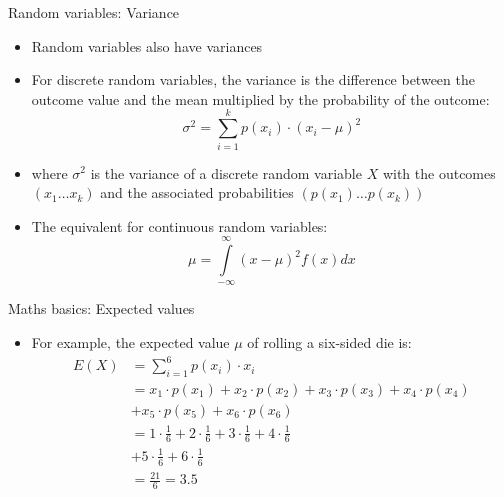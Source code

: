 \begin{frame}{Random variables: Variance}

\begin{itemize}
\itemsep1pt\parskip0pt
\item
  Random variables also have variances
\item
  For discrete random variables, the variance is the difference between
  the outcome value and the mean multiplied by the probability of the
  outcome: \[ \sigma^2 = \sum\limits_{i=1}^k p(x_i)\cdot (x_i - \mu)^2\]
\item
  where \(\sigma^2\) is the variance of a discrete random variable \(X\)
  with the outcomes \((x_1 \dots x_k)\) and the associated probabilities
  \((p(x_1)\dots p(x_k))\)
\item
  The equivalent for continuous random variables:
  \[\mu = \int\limits_{-\infty}^{\infty}(x-\mu)^2 f(x) dx\]
\end{itemize}

\end{frame}

\begin{frame}{Maths basics: Expected values}

\begin{itemize}
\itemsep1pt\parskip0pt
\item
  For example, the expected value \(\mu\) of rolling a six-sided die is:
  \[
  \begin{aligned}
  E(X) &= \sum\limits_{i=1}^{6} p(x_i) \cdot x_i \\
  &= x_1 \cdot p(x_1) + x_2 \cdot p(x_2) + x_3 \cdot p(x_3) + x_4 \cdot p(x_4) \\ 
  &+ x_5 \cdot p(x_5) + x_6 \cdot p(x_6) \\
  &= 1 \cdot \frac{1}{6} + 2 \cdot \frac{1}{6} + 3 \cdot \frac{1}{6} + 4 \cdot \frac{1}{6} \\ 
  &+ 5 \cdot \frac{1}{6} + 6 \cdot \frac{1}{6} \\
  &= \frac{21}{6} = 3.5
  \end{aligned}
  \]
\end{itemize}

\end{frame}

